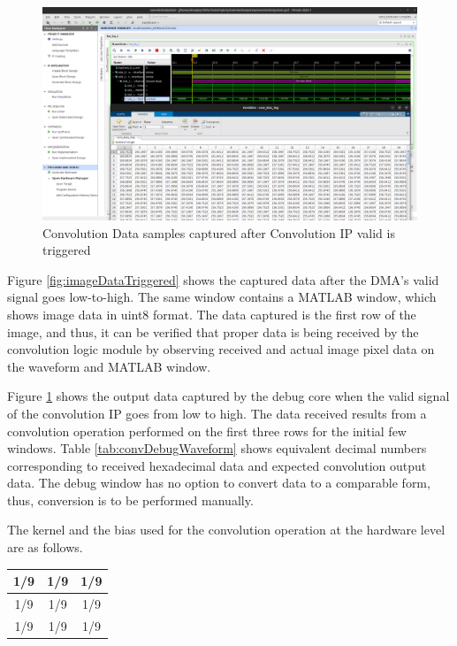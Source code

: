    \begin{figure}[H]
        \centering
        \includegraphics[width=1\linewidth]{images/convResultTriggered.png}
        \caption{Convolution Data samples captured after Convolution IP valid is triggered}
        \label{fig:convResultTriggered}
    \end{figure}

    \noindent
    Figure \ref{fig:imageDataTriggered} shows the captured data after the DMA's valid signal goes low-to-high. The same window contains a MATLAB window, which shows image data in uint8 format. The data captured is the first row of the image, and thus, it can be verified that proper data is being received by the convolution logic module by observing received and actual image pixel data on the waveform and MATLAB window.
    
    \noindent
    Figure \ref{fig:convResultTriggered} shows the output data captured by the debug core when the valid signal of the convolution IP goes from low to high. The data received results from a convolution operation performed on the first three rows for the initial few windows. Table \ref{tab:convDebugWaveform} shows equivalent decimal numbers corresponding to received hexadecimal data and expected convolution output data. The debug window has no option to convert data to a comparable form, thus, conversion is to be performed manually.
    \par \noindent
    The kernel and the bias used for the convolution operation at the hardware level are as follows.
    \begin{center}
    \begin{tabular}{|c|c|c|}
    \hline
    1/9 & 1/9 & 1/9 \\ \hline
    1/9 & 1/9 & 1/9 \\ \hline
    1/9 & 1/9 & 1/9 \\ \hline
    \end{tabular}
    \end{center}

